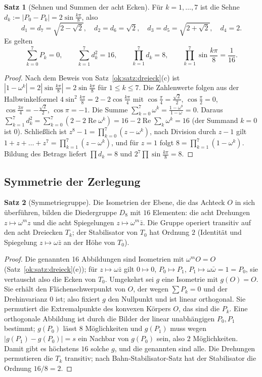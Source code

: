 \documentclass[a4paper,12pt,twoside]{report}
\theoremstyle{definition}
\newtheorem{satz}{Satz}
\begin{document}
\begin{satz}[Sehnen und Summen der acht Ecken]\label{ok:satz:sehnen}
Für $k=1,\dots,7$ ist die Sehne $d_k:=|P_0-P_k|=2\sin\frac{k\pi}8$, also
\[
d_1=d_7=\sqrt{2-\sqrt2},\quad d_2=d_6=\sqrt2,\quad d_3=d_5=\sqrt{2+\sqrt2},\quad d_4=2 .
\]
Es gelten
\[
\sum_{k=0}^7P_k=0,\qquad\sum_{k=1}^7d_k^2=16,\qquad\prod_{k=1}^7d_k=8,\qquad\prod_{k=1}^7\sin\frac{k\pi}8=\frac1{16}.
\]
\end{satz}

\begin{proof}
Nach dem Beweis von Satz~\ref{ok:satz:dreieck}(c) ist $|1-\omega^k|=2|\sin\frac{k\pi}8|=2\sin\frac{k\pi}8$ für $1\le k\le7$. Die Zahlenwerte folgen aus der Halbwinkelformel $4\sin^2\frac{k\pi}8=2-2\cos\frac{k\pi}4$ mit $\cos\frac\pi4=\frac{\sqrt2}2$, $\cos\frac\pi2=0$, $\cos\frac{3\pi}4=-\frac{\sqrt2}2$, $\cos\pi=-1$. Die Summe $\sum_{k=0}^7\omega^k=\frac{1-\omega^8}{1-\omega}=0$. Daraus $\sum_{k=1}^7d_k^2=\sum_{k=0}^7(2-2\operatorname{Re}\omega^k)=16-2\operatorname{Re}\sum_k\omega^k=16$ (der Summand $k=0$ ist $0$). Schließlich ist $z^8-1=\prod_{k=0}^7(z-\omega^k)$, nach Division durch $z-1$ gilt $1+z+\dots+z^7=\prod_{k=1}^7(z-\omega^k)$, und für $z=1$ folgt $8=\prod_{k=1}^7(1-\omega^k)$. Bildung des Betrags liefert $\prod d_k=8$ und $2^7\prod\sin\frac{k\pi}8=8$.
\end{proof}

\subsection{Symmetrie der Zerlegung}
\label{sec:ok:sym}

\begin{satz}[Symmetriegruppe]\label{ok:satz:sym}
Die Isometrien der Ebene, die das Achteck $O$ in sich überführen, bilden die Diedergruppe $D_8$ mit $16$ Elementen: die acht Drehungen $z\mapsto\omega^mz$ und die acht Spiegelungen $z\mapsto\omega^m\bar z$. Die Gruppe operiert transitiv auf den acht Dreiecken $T_k$; der Stabilisator von $T_0$ hat Ordnung $2$ (Identität und Spiegelung $z\mapsto\omega\bar z$ an der Höhe von $T_0$).
\end{satz}

\begin{proof}
Die genannten 16 Abbildungen sind Isometrien mit $\omega^mO=O$ (Satz~\ref{ok:satz:dreieck}(e)); für $z\mapsto\omega\bar z$ gilt $0\mapsto0$, $P_0\mapsto P_1$, $P_1\mapsto\omega\bar\omega=1=P_0$, sie vertauscht also die Ecken von $T_0$. Umgekehrt sei $g$ eine Isometrie mit $g(O)=O$. Sie erhält den Flächenschwerpunkt von $O$, der wegen $\sum P_k=0$ und der Drehinvarianz $0$ ist; also fixiert $g$ den Nullpunkt und ist linear orthogonal. Sie permutiert die Extremalpunkte des konvexen Körpers $O$, das sind die $P_k$. Eine orthogonale Abbildung ist durch die Bilder der linear unabhängigen $P_0,P_1$ bestimmt; $g(P_0)$ lässt $8$ Möglichkeiten und $g(P_1)$ muss wegen $|g(P_1)-g(P_0)|=s$ ein Nachbar von $g(P_0)$ sein, also $2$ Möglichkeiten. Damit gibt es höchstens $16$ solche $g$, und die genannten sind alle. Die Drehungen permutieren die $T_k$ transitiv; nach Bahn-Stabilisator-Satz hat der Stabilisator die Ordnung $16/8=2$.
\end{proof}
\end{document}

